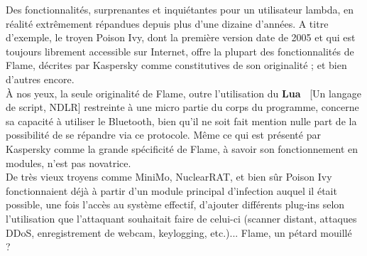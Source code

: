 \documentclass[11pt,twoside,a4paper]{article}
\begin{document}
Des fonctionnalit{\'e}s, surprenantes et inqui{\'e}tantes pour un utilisateur lambda, en r{\'e}alit{\'e} extr{\^e}mement r{\'e}pandues depuis plus d'une dizaine d'ann{\'e}es. A titre d'exemple, le troyen Poison Ivy, dont la premi{\`e}re version date de 2005 et qui est toujours librement accessible sur Internet, offre la plupart des fonctionnalit{\'e}s de Flame, d{\'e}crites par Kaspersky comme constitutives de son originalit{\'e} ; et bien d'autres encore.~\\

{\`A} nos yeux, la seule originalit{\'e} de Flame, outre l'utilisation du \textbf{Lua~} [Un langage de script, NDLR] restreinte {\`a} une micro partie du corps du programme, concerne sa capacit{\'e} {\`a} utiliser le Bluetooth, bien qu'il ne soit fait mention nulle part de la possibilit{\'e} de se r{\'e}pandre via ce protocole. M{\^e}me ce qui est pr{\'e}sent{\'e} par Kaspersky comme la grande sp{\'e}cificit{\'e} de Flame, {\`a} savoir son fonctionnement en modules, n'est pas novatrice.~\\

De tr{\`e}s vieux troyens comme MiniMo, NuclearRAT, et bien s{\^u}r Poison Ivy fonctionnaient d{\'e}j{\`a} {\`a} partir d'un module principal d'infection auquel il {\'e}tait possible, une fois l'acc{\`e}s au syst{\`e}me effectif, d'ajouter diff{\'e}rents plug-ins selon l'utilisation que l'attaquant souhaitait faire de celui-ci (scanner distant, attaques DDoS, enregistrement de webcam, keylogging, etc.)... Flame, un p{\'e}tard mouill{\'e} ?~\\
\end{document}
